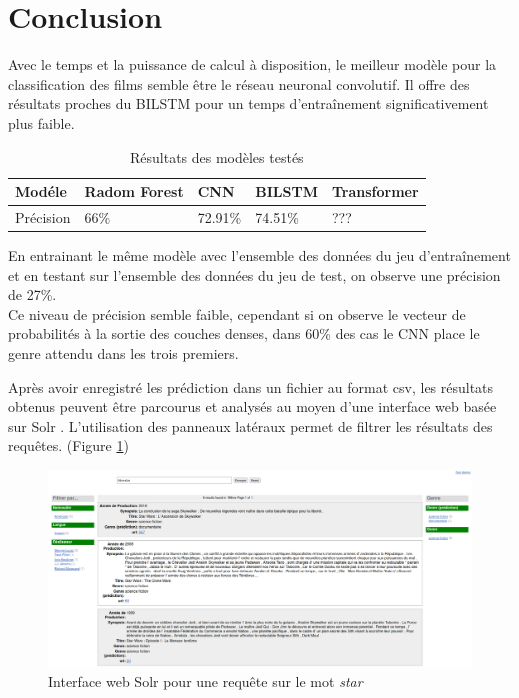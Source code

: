 \section*{Conclusion}
Avec le temps et la puissance de calcul à disposition, le meilleur modèle pour
la classification des films semble être le réseau neuronal convolutif. Il offre
des résultats proches du BILSTM pour un temps d'entraînement significativement
plus faible.

\begin{table}[]
    \begin{tabular}{|l|l|l|l|l|}
        \hline
        Modéle    & Radom Forest & CNN     & BILSTM  & Transformer \\
        \hline
        Précision & 66\%         & 72.91\% & 74.51\% & ???         \\
        \hline
    \end{tabular}
    \caption{Résultats des modèles testés}
    \label{accuracy}
\end{table}

En entrainant le même modèle avec l'ensemble des données du jeu d'entraînement et en testant sur l'ensemble des données du jeu de test, on observe une précision de 27\%.\\
Ce niveau de précision semble faible, cependant si on observe le vecteur de probabilités à la sortie des couches denses, dans 60\% des cas le CNN place le genre attendu dans les trois premiers.

Après avoir enregistré les prédiction dans un fichier au format \textsf{csv}, les résultats obtenus peuvent être parcourus et analysés au moyen d'une interface web basée sur Solr \cite{solr}. L'utilisation des panneaux latéraux permet de filtrer les résultats des requêtes. (Figure \ref{solr})

\begin{figure}
    \center
    \includegraphics[scale=.25]{img/solr.png}
    \caption{Interface web Solr pour une requête sur le mot \textit{star}}
    \label{solr}
\end{figure}